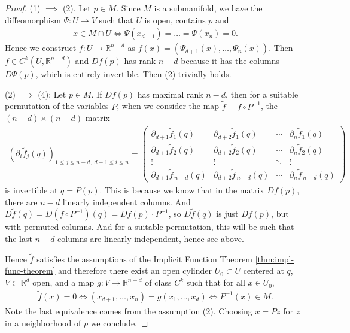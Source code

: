 \begin{proof}
	(1) $\implies$ (2). Let $p \in M$. Since $M$ is a submanifold, we have the diffeomorphism $\Psi: U \to V$ such that $U$ is open, contains $p$ and
	\begin{align*}
		x \in M \cap U \iff \Psi(x_{d+1}) = \dots = \Psi(x_{n}) = 0.
	\end{align*}
	Hence we construct $f: U \to \mathbb{R}^{n-d}$ as $f(x) = (\Psi_{d+1}(x), \dots, \Psi_{n}(x))$. Then $f \in C^{k}(U, \mathbb{R}^{n-d})$ and $Df(p)$ has rank $n-d$ because it has the columns $D \Psi(p)$, which is entirely invertible. Then (2) trivially holds.

	(2) $\implies$ (4): Let $p \in M$. If $Df(p)$ has maximal rank $n-d$, then for a suitable permutation of the
	variables $P$, when we consider the map $\tilde f = f \circ P^{-1}$, the $(n-d)\times(n-d)$ matrix
	\begin{align*}
		\left( \partial_i \tilde f_j(q) \right)_{1 \le j \le n-d,\; d+1 \le i \le n}
		=
		\begin{pmatrix}
			\partial_{d+1}\tilde f_1(q)       & \partial_{d+2}\tilde f_1(q)       & \cdots & \partial_{n}\tilde f_1(q)       \\
			\partial_{d+1}\tilde f_2(q)       & \partial_{d+2}\tilde f_2(q)       & \cdots & \partial_{n}\tilde f_2(q)       \\
			\vdots                            & \vdots                            & \ddots & \vdots                          \\
			\partial_{d+1}\tilde f_{\,n-d}(q) & \partial_{d+2}\tilde f_{\,n-d}(q) & \cdots & \partial_{n}\tilde f_{\,n-d}(q)
		\end{pmatrix}
	\end{align*}
	is invertible at $q = P(p)$. This is because we know that in the matrix $Df(p)$, there are $n-d$ linearly independent columns. And $D\tilde{f}(q) = D(f \circ P^{-1})(q) = Df(p) \cdot P^{-1}$, so $D\tilde{f}(q)$ is just $Df(p)$, but with permuted columns. And for a suitable permutation, this will be such that the last $n-d$ columns are linearly independent, hence see above.

	Hence $\tilde f$ satisfies the assumptions of the Implicit Function Theorem \ref{thm:impl-func-theorem} and therefore there exist an open cylinder $U_0 \subset U$ centered at $q$, $V \subset \mathbb{R}^{d}$ open, and a map $g : V \to \mathbb{R}^{n-d}$ of class $C^{k}$ such that for all $x \in U_0$,
	\begin{align*}
		\tilde f(x) = 0
		\Longleftrightarrow
		(x_{d+1}, \dots, x_{n}) = g(x_1, \dots, x_d)
		\Longleftrightarrow
		P^{-1}(x) \in M .
	\end{align*}
	Note the last equivalence comes from the assumption (2). Choosing $x = Pz$ for $z$ in a neighborhood of $p$ we conclude.


\end{proof}
